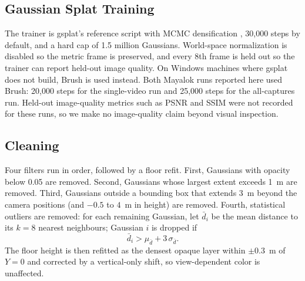 \documentclass[conference]{IEEEtran}
\begin{document}
\subsection{Gaussian Splat Training}
The trainer is gsplat's reference script \cite{ye2024gsplat} with MCMC densification \cite{kheradmand2024mcmc}, 30,000 steps by default, and a hard cap of 1.5 million Gaussians. World-space normalization is disabled so the metric frame is preserved, and every 8th frame is held out so the trainer can report held-out image quality. On Windows machines where gsplat does not build, Brush \cite{brush} is used instead. Both Mayalok runs reported here used Brush: 20,000 steps for the single-video run and 25,000 steps for the all-captures run. Held-out image-quality metrics such as PSNR and SSIM \cite{wang2004ssim} were not recorded for these runs, so we make no image-quality claim beyond visual inspection.

\subsection{Cleaning}
Four filters run in order, followed by a floor refit. First, Gaussians with opacity below 0.05 are removed. Second, Gaussians whose largest extent exceeds 1~m are removed. Third, Gaussians outside a bounding box that extends 3~m beyond the camera positions (and $-0.5$ to $4$~m in height) are removed. Fourth, statistical outliers are removed: for each remaining Gaussian, let $\bar{d}_i$ be the mean distance to its $k=8$ nearest neighbours; Gaussian $i$ is dropped if
\begin{equation}
\bar{d}_i > \mu_{\bar{d}} + 3\,\sigma_{\bar{d}}.
\end{equation}
The floor height is then refitted as the densest opaque layer within $\pm 0.3$~m of $Y=0$ and corrected by a vertical-only shift, so view-dependent color is unaffected.
\end{document}
